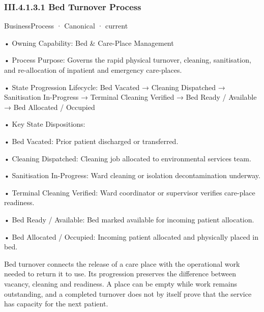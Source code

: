 \subsubsection*{III.4.1.3.1 Bed Turnover Process}
\label{navigation:III.4.1.3.1}

\label{element:69f74289926942f4baed4acf4c654a3b}
{\small BusinessProcess · Canonical · current}\par

•
Owning Capability: Bed \& Care-Place Management



•
Process Purpose: Governs the rapid physical turnover, cleaning, sanitisation, and re-allocation of inpatient and emergency care-places.



•
State Progression Lifecycle: Bed Vacated → Cleaning Dispatched → Sanitisation In-Progress → Terminal Cleaning Verified → Bed Ready / Available → Bed Allocated / Occupied



•
Key State Dispositions:



•
Bed Vacated: Prior patient discharged or transferred.



•
Cleaning Dispatched: Cleaning job allocated to environmental services team.



•
Sanitisation In-Progress: Ward cleaning or isolation decontamination underway.



•
Terminal Cleaning Verified: Ward coordinator or supervisor verifies care-place readiness.



•
Bed Ready / Available: Bed marked available for incoming patient allocation.



•
Bed Allocated / Occupied: Incoming patient allocated and physically placed in bed.



Bed turnover connects the release of a care place with the operational work needed to return it to use. Its progression preserves the difference between vacancy, cleaning and readiness. A place can be empty while work remains outstanding, and a completed turnover does not by itself prove that the service has capacity for the next patient.


